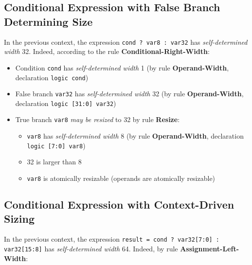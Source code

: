 \documentclass{article}
\newcommand{\sv}[1]{\texttt{#1}}
\newcommand{\sds}{\emph{self-determined width}}
\newcommand{\mbr}{\emph{may be resized}}
\begin{document}
\subsection{Conditional Expression with False Branch Determining Size}

In the previous context, the expression \sv{cond ? var8 : var32} has
\sds{} 32. Indeed, according to the rule \textbf{Conditional-Right-Width}:

\begin{itemize}
  \item Condition \sv{cond} has \sds{} 1 (by rule
    \textbf{Operand-Width}, declaration \sv{logic cond})
  \item False branch \sv{var32} has \sds{} 32 (by rule
    \textbf{Operand-Width}, declaration \sv{logic [31:0] var32})
  \item True branch \sv{var8} \mbr{} to 32 by rule
    \textbf{Resize}:
    \begin{itemize}
      \item \sv{var8} has \sds{} 8 (by rule
        \textbf{Operand-Width}, declaration \sv{logic [7:0] var8})
      \item 32 is larger than 8
      \item \sv{var8} is atomically resizable (operands are atomically
        resizable)
    \end{itemize}
\end{itemize}

\subsection{Conditional Expression with Context-Driven Sizing}

In the previous context, the expression
\sv{result = cond ? var32[7:0] : var32[15:8]} has \sds{}
64. Indeed, by rule \textbf{Assignment-Left-Width}:
\end{document}
